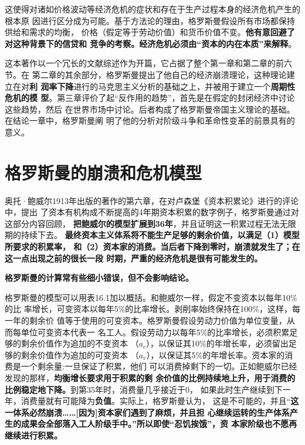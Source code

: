 这使得对诸如价格波动等经济危机的症状和存在于生产过程本身的经济危机产生的根本原
因进行区分成为可能。基于方法论的理由，格罗斯曼假设所有市场都保持供给和需求的均衡，
价格（假定等于劳动价值）和货币价值不变。\textbf{他有意回避了对这种背景下的信贷和
竞争的考察。经济危机必须由“资本的内在本质”来解释}。

这本著作以一个冗长的文献综述作为开篇，它占据了整个第一章和第二章的前六节。在
第二章的其余部分，格罗斯曼提出了他自己的经济崩溃理论，这种理论建立在对\textbf{利
润率下降}进行的马克思主义分析的基础之上，并被用于建立一个\textbf{周期性危机的模
型}。第三章评价了起“反作用的趋势”，首先是在假定的封闭经济中讨论这些趋势，然后
在世界市场中讨论。后者构成了格罗斯曼帝国主义理论的基础。在结论一章中，格罗斯曼阐
明了他的分析对阶级斗争和革命性变革的前景具有的意义。


\section{格罗斯曼的崩溃和危机模型}

奥托·鲍威尔1913年出版的著作的第六章，在对卢森堡《资本积累论》进行的评论中，提出
了资本有机构成不断提高的4年期资本积累的数字例子，格罗斯曼通过对这部分内容回顾，
\textbf{把鲍威尔的模型扩展到36年}，并且证明这一积累过程无法无限期的持续下去。
\textbf{最终资本主义体系将不能生产足够的剩余价值，以满足（1）模型所要求的积累率，
和（2）资本家的消费。当后者下降到零时，崩溃就发生了；在这一点出现之前的很长一段
时期，严重的经济危机是很有可能发生的。}


\textbf{格罗斯曼的计算常有些细小错误，但不会影响结论。}

格罗斯曼的模型可以用表16.1加以概括。和鲍威尔一样，假定不变资本以每年10\%的比
率增长，可变资本以每年5\%的比率增长。剥削率始终保持在100\%，这样，每一年的剩余价
值等于使用的可变资本。格罗斯曼假设劳动力价值为单位变量，从而每单位可变资本代表一
名工人。假设劳动力以每年5\%的比率增长，必须积累足够的剩余价值作为追加的不变资本
（$a_c$），以保证其10\%的年增长率，必须留出足够的剩余价值作为追加的可变资本
（$a_v$），以保证其5\%的年增长率。资本家的消费是一个剩余量:一旦保证了积累，他们
可以消费掉剩下的一切。正如鲍威尔已经发现的那样，\textbf{均衡增长要求用于积累的剩
余价值的比例持续地上升，用于消费的比例稳定地下降。}到第35年时，消费量几乎接近于0，
如果此时生产继续到下一年，消费量就有可能降为\textbf{负值}。实际上，格罗斯曼认为，
这是不可能的，并且“\textbf{这一体系必然崩溃……[因为]资本家们遇到了麻烦，并且担
心继续运转的生产体系产生的成果会全部落入工人阶级手中。”所以即使“忍饥挨饿”，资
本家阶级也不愿再继续进行积累。}



